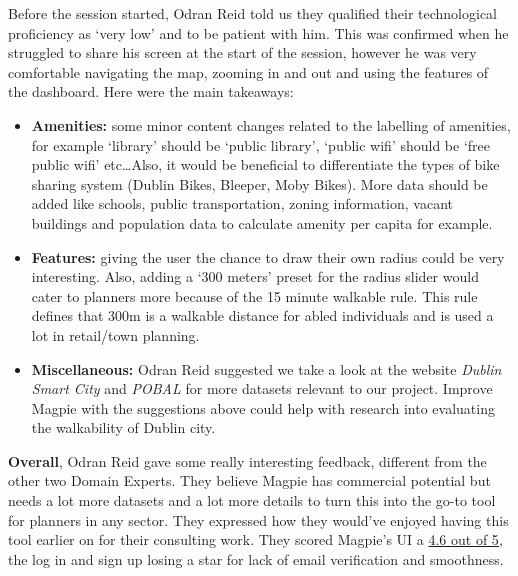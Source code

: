 \newpage{}

\noindent Before the session started, Odran Reid told us they qualified their
technological proficiency as `very low' and to be patient with him. This was
confirmed when he struggled to share his screen at the start of the session,
however he was very comfortable navigating the map, zooming in and out and using
the features of the dashboard. Here were the main takeaways:
\begin{itemize}
    \item \textbf{Amenities:} some minor content changes related to the
    labelling of amenities, for example `library' should be `public library',
    `public wifi' should be `free public wifi' etc\ldots Also, it would be
    beneficial to differentiate the types of bike sharing system (Dublin Bikes,
    Bleeper, Moby Bikes). More data should be added like schools, public
    transportation, zoning information, vacant buildings and population data to
    calculate amenity per capita for example.
    \vspace{0.2cm}

    \item \textbf{Features:} giving the user the chance to draw their own radius
    could be very interesting. Also, adding a `300 meters' preset for the radius
    slider would cater to planners more because of the 15 minute walkable
    rule. This rule defines that 300m is a walkable distance for abled
    individuals and is used a lot in retail/town planning.
    \vspace{0.2cm}

    \item \textbf{Miscellaneous:} Odran Reid suggested we take a look at the
    website \emph{Dublin Smart City} and \emph{POBAL} for more datasets relevant
    to our project. Improve Magpie with the suggestions above could help with
    research into evaluating the walkability of Dublin city.
    \vspace{0.2cm}
\end{itemize}
\textbf{Overall}, Odran Reid gave some really interesting feedback, different
from the other two Domain Experts. They believe Magpie has commercial potential
but needs a lot more datasets and a lot more details to turn this into the go-to
tool for planners in any sector. They expressed how they would've enjoyed having
this tool earlier on for their consulting work.
They scored Magpie's UI a \underline{4.6 out of 5}, the log in and sign up
losing a star for lack of email verification and smoothness.
